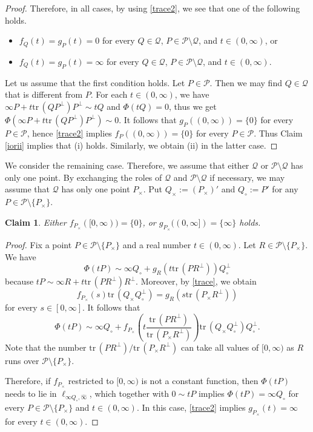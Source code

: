 \documentclass[10pt]{amsart}
\newtheorem{claim}[theorem]{Claim}
\theoremstyle{definition}
\theoremstyle{remark}
\numberwithin{subsection}{section}
\numberwithin{equation}{section}
\newcommand\cP{{\mathcal{P}}}
\newcommand\oi{{\widehat{\infty}}}
\begin{document}
\begin{proof}
Therefore, in all cases, by using \eqref{trace2}, we see that one of the following holds. 
\begin{itemize}
\item $f_Q(t)=g_P(t)=0$ for every $Q\in \mathcal{Q}$, $P\in \cP\setminus \mathcal{Q}$, and $t\in (0, \infty)$, or
\item $f_Q(t)=g_P(t)=\infty$ for every $Q\in \mathcal{Q}$, $P\in \cP\setminus \mathcal{Q}$, and $t\in (0, \infty)$.
\end{itemize}

Let us assume that the first condition holds. 
Let $P\in \cP$.
Then we may find $Q\in \mathcal{Q}$ that is different from $P$. 
For each $t\in (0,\infty)$, we have $\infty P +t \mathrm{tr}\,(Q{P}^\perp) P^\perp \sim t Q$ and $\Phi(tQ)=0$, thus we get $\Phi(\infty P +t \mathrm{tr}\,(Q{P}^\perp) P^\perp)\sim 0$. 
It follows that $g_P((0,\infty))=\{0\}$ for every $P\in \cP$, hence \eqref{trace2} implies $f_P((0,\infty))=\{0\}$ for every $P\in \cP$.
Thus Claim \ref{iorii} implies that (i) holds.
Similarly, we obtain (ii) in the latter case.
\end{proof}

We consider the remaining case. 
Therefore, we assume that either $\mathcal{Q}$ or $\cP\setminus \mathcal{Q}$ has only one point. 
By exchanging the roles of $\mathcal{Q}$ and $\cP\setminus \mathcal{Q}$ if necessary, we may assume that $\mathcal{Q}$ has only one point $P_\times$. 
Put $Q_\times:= (P_\times)'$ and $Q_\circ := P'$ for any $P\in \cP\setminus \{P_\times\}$.

\begin{claim}\label{rojdanb}
Either $f_{P_\times}([0, \infty))=\{0\}$, or $g_{P_\times}((0, \infty])=\{\infty\}$ holds.
\end{claim}
\begin{proof}
Fix a point $P\in \cP\setminus\{P_\times\}$ and a real number $t\in (0, \infty)$. 
Let $R\in \cP\setminus \{P_\times\}$. 
We have
\[
\Phi(tP)\sim \infty Q_\circ + g_{R}(t\mathrm{tr}\,(PR^\perp))Q_\circ^\perp 
\]
because $tP\sim \infty R + t\mathrm{tr}\,(PR^\perp) R^\perp$.
Moreover, by \eqref{trace}, we obtain  
\begin{equation}\label{kkkjk}
f_{P_\times}(s) \mathrm{tr}\,(Q_\times Q_\circ^\perp) = g_{R}(s\mathrm{tr}\,(P_\times R^\perp))
\end{equation}
for every $s\in [0, \infty]$.
It follows that
\[
\Phi(tP)\sim \infty Q_\circ + f_{P_\times}\left(t\frac{\mathrm{tr}\,(PR^\perp)}{\mathrm{tr}\,(P_\times R^\perp)}\right) \mathrm{tr}\,(Q_\times Q_\circ^\perp) Q_\circ^\perp. 
\]
Note that the number ${\mathrm{tr}\,(PR^\perp)}/{\mathrm{tr}\,(P_\times R^\perp)}$ can take all values of $[0, \infty)$ as $R$ runs over $\cP\setminus \{P_\times\}$. 

Therefore, if $f_{P_\times}$ restricted to $[0, \infty)$ is not a constant function, then $\Phi(tP)$ needs to lie in $\ell_{\infty Q_\circ, \oi}$, which together with $0\sim tP$ implies $\Phi(tP)=\infty Q_\circ$ for every $P\in \cP\setminus \{P_\times\}$ and $t\in (0, \infty)$. In this case, \eqref{trace2} implies $g_{P_\times}(t)=\infty$ for every $t\in (0, \infty)$.
\end{proof}
\end{document}

